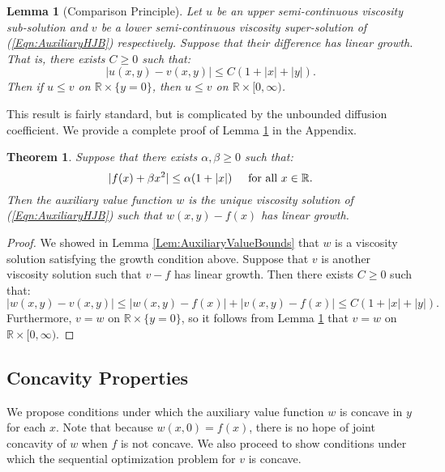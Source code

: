 \documentclass[11pt]{article}
\newtheorem{lem}{Lemma}
\newtheorem{thm}{Theorem}
\begin{document}
\begin{lem}[Comparison Principle]\label{Lem:ComparisonPrinciple}
Let $u$ be an upper semi-continuous viscosity sub-solution and $v$ be a lower semi-continuous viscosity super-solution of (\ref{Eqn:AuxiliaryHJB}) respectively. Suppose that their difference has linear growth. That is, there exists $C\geq 0$ such that:
\[|u(x,y)-v(x,y)|\leq C(1+|x|+|y|).\]
Then if $u\leq v$ on $\mathbb{R}\times\{y=0\}$, then $u\leq v$ on $\mathbb{R}\times [0,\infty)$.\end{lem}

This result is fairly standard, but is complicated by the unbounded diffusion coefficient. We provide a complete proof of Lemma \ref{Lem:ComparisonPrinciple} in the Appendix.

\begin{thm}\label{Thm:UniqueHJB}
Suppose that there exists $\alpha,\beta\geq 0$ such that:
\[|f(x)+\beta x^2|\leq\alpha(1+|x|)\hspace{0.5cm}\text{for all }x\in\mathbb{R}.\]
Then the auxiliary value function $w$ is the unique viscosity solution of (\ref{Eqn:AuxiliaryHJB}) such that $w(x,y)-f(x)$ has linear growth.\end{thm}
\begin{proof}
We showed in Lemma \ref{Lem:AuxiliaryValueBounds} that $w$ is a viscosity solution satisfying the growth condition above. Suppose that $v$ is another viscosity solution such that $v-f$ has linear growth. Then there exists $C\geq 0$ such that:
\[|w(x,y)-v(x,y)|\leq |w(x,y)-f(x)|+|v(x,y)-f(x)|\leq C(1+|x|+|y|).\]
Furthermore, $v=w$ on $\mathbb{R}\times\{y=0\}$, so it follows from Lemma \ref{Lem:ComparisonPrinciple} that $v=w$ on $\mathbb{R}\times[0,\infty)$.
\end{proof}

\subsection{Concavity Properties}

We propose conditions under which the auxiliary value function $w$ is concave in $y$ for each $x$. Note that because $w(x,0)=f(x)$, there is no hope of joint concavity of $w$ when $f$ is not concave. We also proceed to show conditions under which the sequential optimization problem for $v$ is concave.
\end{document}
